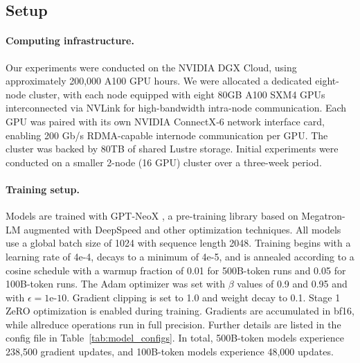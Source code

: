 \documentclass{article} %
\begin{document}
\subsection{Setup}

\paragraph{Computing infrastructure.} Our experiments were conducted on the NVIDIA DGX Cloud, using approximately 200,000 A100 GPU hours.
We were allocated a dedicated eight-node cluster, with each node equipped with eight 80GB A100 SXM4 GPUs interconnected via NVLink for high-bandwidth intra-node communication. Each GPU was paired with its own NVIDIA ConnectX‑6 network interface card, enabling 200 Gb/s RDMA-capable internode communication per GPU. The cluster was backed by 80TB of shared Lustre storage. Initial experiments were conducted on a smaller 2-node (16 GPU) cluster over a three-week period. 



\paragraph{Training setup.} Models are trained with GPT-NeoX \citep{gpt-neox-library}, a pre-training library based on Megatron-LM \citep{megatron-lm} augmented with DeepSpeed and other optimization techniques.
All models use a global batch size of 1024 with sequence length 2048. Training begins with a learning rate of 4e-4, decays to a minimum of 4e-5, and is annealed according to a cosine schedule with a warmup fraction of 0.01 for 500B-token runs and 0.05 for 100B-token runs. The Adam optimizer was set with $\beta$ values of 0.9 and 0.95 and with $\epsilon = 1\text{e-}10$. Gradient clipping is set to 1.0 and weight decay to 0.1. Stage 1 ZeRO optimization \citep{rajbhandari2020zeromemoryoptimizationstraining} is enabled during training. Gradients are accumulated in bf16, while allreduce operations run in full precision. Further details are listed in the config file in Table~\ref{tab:model_configs}. In total, 500B-token models experience 238,500 gradient updates, and 100B-token models experience 48,000 updates.

\end{document}

